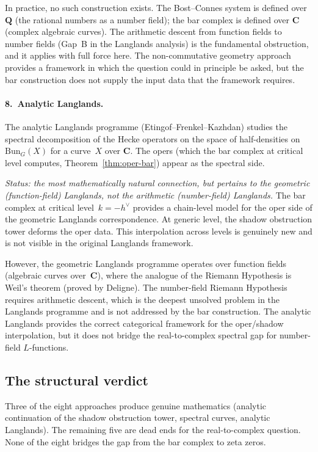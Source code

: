 \documentclass[11pt]{article}
\begin{document}
In practice, no such construction exists.  The Bost--Connes
system is defined over $\mathbf{Q}$ (the rational numbers as a
number field); the bar complex is defined over $\mathbf{C}$
(complex algebraic curves).  The arithmetic descent from
function fields to number fields (Gap~B in the Langlands
analysis) is the fundamental obstruction, and it applies with
full force here.  The non-commutative geometry approach provides
a framework in which the question could in principle be asked,
but the bar construction does not supply the input data that the
framework requires.

\paragraph{8.~Analytic Langlands.}
The analytic Langlands programme (Etingof--Frenkel--Kazhdan)
studies the spectral decomposition of the Hecke operators on
the space of half-densities on $\mathrm{Bun}_G(X)$ for a
curve~$X$ over $\mathbf{C}$.  The opers (which the bar complex
at critical level computes, Theorem~\ref{thm:oper-bar}) appear
as the spectral side.

\emph{Status: the most mathematically natural connection, but
pertains to the geometric (function-field) Langlands, not the
arithmetic (number-field) Langlands.}  The bar complex at
critical level~$k = -h^\vee$ provides a chain-level model for
the oper side of the geometric Langlands correspondence.
At generic level, the shadow obstruction tower deforms the oper data.
This interpolation across levels is genuinely new and is not
visible in the original Langlands framework.

However, the geometric Langlands programme operates over
function fields (algebraic curves over~$\mathbf{C}$), where the
analogue of the Riemann Hypothesis is Weil's theorem (proved by
Deligne).  The number-field Riemann Hypothesis requires
arithmetic descent, which is the deepest unsolved problem in the
Langlands programme and is not addressed by the bar construction.
The analytic Langlands provides the correct categorical
framework for the oper/shadow interpolation, but it does not
bridge the real-to-complex spectral gap for number-field
$L$-functions.


\subsection{The structural verdict}

Three of the eight approaches produce genuine mathematics
(analytic continuation of the shadow obstruction tower, spectral curves,
analytic Langlands).  The remaining five are dead ends for the
real-to-complex question.  None of the eight bridges the gap
from the bar complex to zeta zeros.
\end{document}
